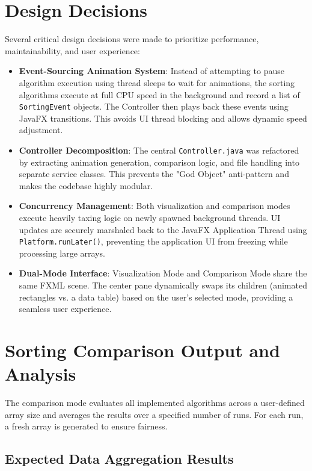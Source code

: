 \documentclass[11pt,a4paper]{article}
\begin{document}
\section{Design Decisions}

Several critical design decisions were made to prioritize performance, maintainability, and user experience:

\begin{itemize}[itemsep=0.3em]
    \item \textbf{Event-Sourcing Animation System}: Instead of attempting to pause algorithm execution using thread sleeps to wait for animations, the sorting algorithms execute at full CPU speed in the background and record a list of \texttt{SortingEvent} objects. The Controller then plays back these events using JavaFX transitions. This avoids UI thread blocking and allows dynamic speed adjustment.
    \item \textbf{Controller Decomposition}: The central \texttt{Controller.java} was refactored by extracting animation generation, comparison logic, and file handling into separate service classes. This prevents the "God Object" anti-pattern and makes the codebase highly modular.
    \item \textbf{Concurrency Management}: Both visualization and comparison modes execute heavily taxing logic on newly spawned background threads. UI updates are securely marshaled back to the JavaFX Application Thread using \texttt{Platform.runLater()}, preventing the application UI from freezing while processing large arrays.
    \item \textbf{Dual-Mode Interface}: Visualization Mode and Comparison Mode share the same FXML scene. The center pane dynamically swaps its children (animated rectangles vs. a data table) based on the user's selected mode, providing a seamless user experience.
\end{itemize}

\section{Sorting Comparison Output and Analysis}

The comparison mode evaluates all implemented algorithms across a user-defined array size and averages the results over a specified number of runs. For each run, a fresh array is generated to ensure fairness.

\subsection*{Expected Data Aggregation Results}
\end{document}
